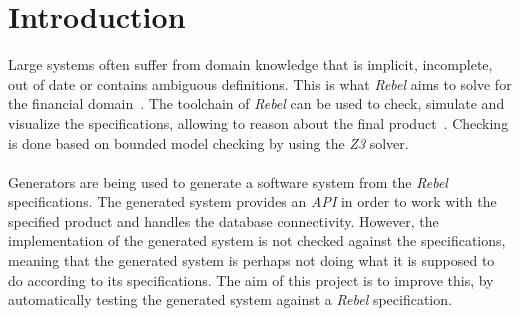 \chapter{Introduction}
\label{chp:intro}
Large systems often suffer from domain knowledge that is implicit, incomplete,
out of date or contains ambiguous definitions. This is what \textit{Rebel} aims
to solve for the financial domain~\cite{stoel2016solving}. The toolchain of \textit{Rebel} can be used to
check, simulate and visualize the specifications, allowing to reason about the
final product~\cite{stoel2015case}. Checking is done based on bounded model checking
by using the \textit{Z3} solver.\\
\\
Generators are being used to generate a software system from the \textit{Rebel}
specifications. The generated system provides an \textit{API} in order to work with the
specified product and handles the database connectivity. However, the
implementation of the generated system is not checked against the
specifications, meaning that the generated system is perhaps not doing what it
is supposed to do according to its specifications. The aim of this project is to
improve this, by automatically testing the generated system against a
\textit{Rebel} specification.

